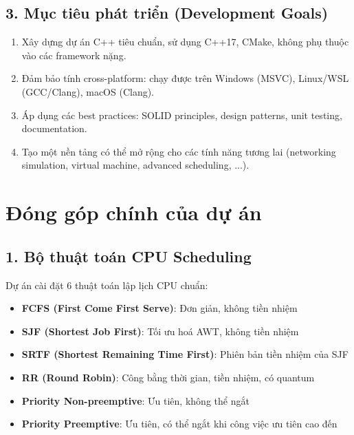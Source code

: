 \subsection*{3. Mục tiêu phát triển (Development Goals)}

\begin{enumerate}[leftmargin=1.5cm]
  \item Xây dựng dự án C++ tiêu chuẩn, 
  sử dụng C++17, CMake, không phụ thuộc vào các framework nặng.
  
  \item Đảm bảo tính cross-platform: 
  chạy được trên Windows (MSVC), Linux/WSL (GCC/Clang), macOS (Clang).
  
  \item Áp dụng các best practices: 
  SOLID principles, design patterns, unit testing, documentation.
  
  \item Tạo một nền tảng có thể mở rộng cho các tính năng tương lai 
  (networking simulation, virtual machine, advanced scheduling, ...).
\end{enumerate}

\section{Đóng góp chính của dự án}

\subsection*{1. Bộ thuật toán CPU Scheduling}

Dự án cài đặt 6 thuật toán lập lịch CPU chuẩn:

\begin{itemize}[leftmargin=1.5cm]
  \item \textbf{FCFS (First Come First Serve)}: Đơn giản, không tiền nhiệm
  \item \textbf{SJF (Shortest Job First)}: Tối ưu hoá AWT, không tiền nhiệm
  \item \textbf{SRTF (Shortest Remaining Time First)}: Phiên bản tiền nhiệm của SJF
  \item \textbf{RR (Round Robin)}: Công bằng thời gian, tiền nhiệm, có quantum
  \item \textbf{Priority Non-preemptive}: Ưu tiên, không thể ngắt
  \item \textbf{Priority Preemptive}: Ưu tiên, có thể ngắt khi công việc ưu tiên cao đến
\end{itemize}

